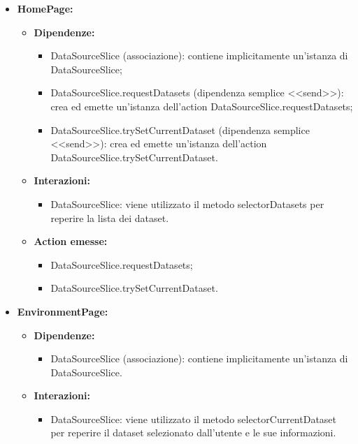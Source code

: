\begin{itemize}
      \item \textbf{HomePage:}
            \begin{itemize}
                  \item \textbf{Dipendenze:}
                        \begin{itemize}
                              \item DataSourceSlice (associazione): contiene implicitamente un'istanza di
                                    DataSourceSlice;
                              \item DataSourceSlice.requestDatasets (dipendenza semplice <<send>>): crea ed emette
                                    un'istanza dell'action DataSourceSlice.requestDatasets;
                              \item DataSourceSlice.trySetCurrentDataset (dipendenza semplice <<send>>): crea ed
                                    emette un'istanza dell'action DataSourceSlice.trySetCurrentDataset.
                        \end{itemize}
                  \item \textbf{Interazioni:}
                        \begin{itemize}
                              \item DataSourceSlice: viene utilizzato il metodo selectorDatasets per reperire la
                                    lista dei dataset.
                        \end{itemize}
                  \item \textbf{Action emesse:}
                        \begin{itemize}
                              \item DataSourceSlice.requestDatasets;
                              \item DataSourceSlice.trySetCurrentDataset.
                        \end{itemize}
            \end{itemize}

      \item \textbf{EnvironmentPage:}
            \begin{itemize}
                  \item \textbf{Dipendenze:}
                        \begin{itemize}
                              \item DataSourceSlice (associazione): contiene implicitamente un'istanza di
                                    DataSourceSlice.
                        \end{itemize}
                  \item \textbf{Interazioni:}
                        \begin{itemize}
                              \item DataSourceSlice: viene utilizzato il metodo selectorCurrentDataset per reperire
                                    il dataset selezionato dall'utente e le sue informazioni.
                        \end{itemize}
            \end{itemize}
\end{itemize}


